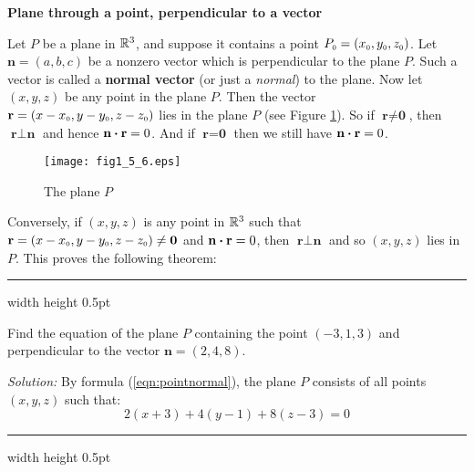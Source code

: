 \par\noindent\textbf{\large{Plane through a point, perpendicular to a vector}}\normalsize\vspace{1.5mm}

Let $P$ be a plane in $\mathbb{R}^{3}$, and suppose it contains a point
$P_{\scriptscriptstyle 0} = (x_{\scriptscriptstyle 0},y_{\scriptscriptstyle 0},z_{\scriptscriptstyle 0})$. Let $\textbf{n} = (a,b,c)$ be a nonzero vector which is
perpendicular to the plane $P$. Such a vector is called a \textbf{normal vector} (or just a \emph{normal}) to the plane.
 Now let $(x,y,z)$ be any point in the plane $P$. Then the vector
$\textbf{r} = (x - x_{\scriptscriptstyle 0},y - y_{\scriptscriptstyle 0},z - z_{\scriptscriptstyle 0})$ lies in the plane $P$ (see Figure \ref{fig:planenorm}).
So if $\textbf{r} \ne \textbf{0}$, then $\textbf{r} \perp \textbf{n}$ and hence $\textbf{n} \bm{\cdot} \textbf{r} = 0$.
And if $\textbf{r} = \textbf{0}$ then we still have $\textbf{n} \bm{\cdot} \textbf{r} = 0$.

\begin{figure}[h]
 \begin{center}
  \texttt{[image: fig1\_5\_6.eps]}
 \end{center}\vspace{-5mm}
 \caption[]{\quad The plane $P$}
 \label{fig:planenorm}
\end{figure}

Conversely, if $(x,y,z)$ is any point in $\mathbb{R}^{3}$ such that $\textbf{r} = (x - x_{\scriptscriptstyle 0},y - y_{\scriptscriptstyle 0},z -
z_{\scriptscriptstyle 0}) \ne \textbf{0}$ and $\textbf{n} \bm{\cdot} \textbf{r} = 0$, then $\textbf{r} \perp \textbf{n}$ and
so $(x,y,z)$ lies in $P$. This proves the following theorem:

\hrule width \textwidth height 0.5pt
\begin{exmp}\label{exmp:pointnormal}
 Find the equation of the plane $P$ containing the point $(-3,1,3)$ and perpendicular to the vector $\textbf{n} =
 (2,4,8)$.\vspace{1mm}
 \par\noindent\emph{Solution:} By formula (\ref{eqn:pointnormal}), the plane $P$ consists of all points $(x,y,z)$ such
 that:
 \begin{displaymath}
  2(x + 3) + 4(y - 1) + 8(z - 3) = 0
 \end{displaymath}
\end{exmp}
\hrule width \textwidth height 0.5pt
\vspace{2mm}

